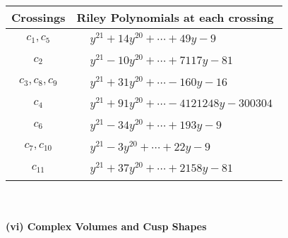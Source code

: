 \documentclass[1p]{elsarticle_modified}
\theoremstyle{definition}
\begin{document}
\begin{tabular}{m{50pt}|m{274pt}}
Crossings & \hspace{64pt}Riley Polynomials at each crossing \\
\hline $$\begin{aligned}c_{1},c_{5}\end{aligned}$$&$\begin{aligned}
&y^{21}+14 y^{20}+\cdots+49 y-9
\end{aligned}$\\
\hline $$\begin{aligned}c_{2}\end{aligned}$$&$\begin{aligned}
&y^{21}-10 y^{20}+\cdots+7117 y-81
\end{aligned}$\\
\hline $$\begin{aligned}c_{3},c_{8},c_{9}\end{aligned}$$&$\begin{aligned}
&y^{21}+31 y^{20}+\cdots-160 y-16
\end{aligned}$\\
\hline $$\begin{aligned}c_{4}\end{aligned}$$&$\begin{aligned}
&y^{21}+91 y^{20}+\cdots-4121248 y-300304
\end{aligned}$\\
\hline $$\begin{aligned}c_{6}\end{aligned}$$&$\begin{aligned}
&y^{21}-34 y^{20}+\cdots+193 y-9
\end{aligned}$\\
\hline $$\begin{aligned}c_{7},c_{10}\end{aligned}$$&$\begin{aligned}
&y^{21}-3 y^{20}+\cdots+22 y-9
\end{aligned}$\\
\hline $$\begin{aligned}c_{11}\end{aligned}$$&$\begin{aligned}
&y^{21}+37 y^{20}+\cdots+2158 y-81
\end{aligned}$\\
\hline
\end{tabular}\\~\\
\newpage\flushleft \textbf{(vi) Complex Volumes and Cusp Shapes}
\end{document}

